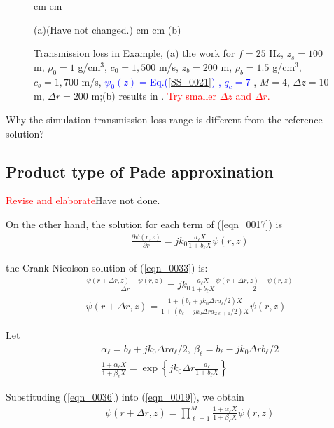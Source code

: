 \documentclass[journal,onecolumn]{IEEEtran}
\begin{document}
\begin{figure}[h]
 cm
 cm
(a)(\textcolor{dg}{Have not changed.})
 cm
 cm
(b)
\caption{Transmission loss in Example, (a) the work for
$f = 25$ Hz, $z_s = 100$ m, $\rho_0 = 1 $ g/cm$^3$, $c_0 = 1,500$ m/s,
$z_b = 200$ m, $\rho_b =  1.5 $ g/cm$^3$, $c_b = 1,700$ m/s,
\textcolor{blue}{
$\psi_0(z) = $Eq.(\ref{SS_0021}) 
, $q_c = 7$
}
, $M = 4$, $\Delta z = 10$ m, $\Delta r = 200$ m;(b) results in \cite{MDC_ASSPS}.
\textcolor{red}{Try smaller $\Delta z$ and $\Delta r$.}}
\label{Fig_pic3}
\end{figure}
Why the simulation transmission loss range is different from the reference solution?


\subsection{Product type of  Pade approxination}

\textcolor{red}{Revise and elaborate}\textcolor{dg}{Have not done.}

\cite{MDC_ASSPS} On the other hand, the solution for each term of (\ref{eqn_0017}) is 
\begin{eqnarray}
&&\frac{\partial \psi(r, z)}{\partial r} = j k_0 \frac{a_\ell X}{1 + b_\ell X} \psi(r, z)
\label{eqn_0033}
\end{eqnarray}

the Crank-Nicolson solution of (\ref{eqn_0033}) is:
\begin{eqnarray}
&&\frac{\psi(r + \Delta r, z) - \psi(r, z)}{\Delta r} = j k_0 \frac{a_\ell X}{1 + b_\ell X} \frac{\psi(r + \Delta r, z) + \psi(r, z)}{2} 
\nonumber \\
&&\psi(r + \Delta r, z) = \frac{1 + (b_\ell + j k_0 \Delta r a_\ell / 2) X}{1 + (b_\ell - j k_0 \Delta r a_{2 \ell + 1} / 2) X} \psi(r, z) 
\label{eqn_0034}
\end{eqnarray}

Let
\begin{eqnarray}
&&\alpha_\ell = b_\ell + j k_0 \Delta r a_\ell / 2 ,
\ \beta_\ell = b_\ell - j k_0 \Delta r b_\ell / 2 
\label{eqn_0035}\\
&&\frac{1 + \alpha_\ell X}{1 + \beta_\ell X} = \exp\left\{j k_0 \Delta r \frac{a_\ell} {1 + b_\ell X}  \right\}
\label{eqn_0036}
\end{eqnarray}

Substituding (\ref{eqn_0036}) into (\ref{eqn_0019}), we obtain
\begin{eqnarray}
&&\psi(r + \Delta r, z) = \prod^M_{\ell = 1} \frac{1 + \alpha_\ell X}{1 + \beta_\ell X} \psi(r, z)
\label{eqn_0037}
\end{eqnarray}
\end{document}
